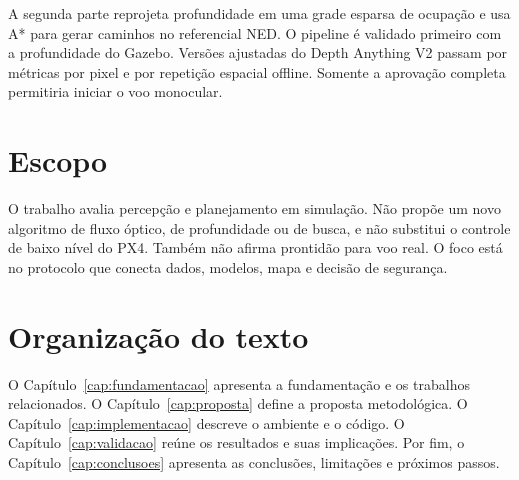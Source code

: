 A segunda parte reprojeta profundidade em uma grade esparsa de ocupação e usa A* para gerar caminhos no referencial NED. O pipeline é validado primeiro com a profundidade do Gazebo. Versões ajustadas do Depth Anything V2 passam por métricas por pixel e por repetição espacial offline. Somente a aprovação completa permitiria iniciar o voo monocular.

\section{Escopo}

O trabalho avalia percepção e planejamento em simulação. Não propõe um novo algoritmo de fluxo óptico, de profundidade ou de busca, e não substitui o controle de baixo nível do PX4. Também não afirma prontidão para voo real. O foco está no protocolo que conecta dados, modelos, mapa e decisão de segurança.

\section{Organização do texto}\label{Organizacao_do_texto}

O Capítulo~\ref{cap:fundamentacao} apresenta a fundamentação e os trabalhos relacionados. O Capítulo~\ref{cap:proposta} define a proposta metodológica. O Capítulo~\ref{cap:implementacao} descreve o ambiente e o código. O Capítulo~\ref{cap:validacao} reúne os resultados e suas implicações. Por fim, o Capítulo~\ref{cap:conclusoes} apresenta as conclusões, limitações e próximos passos.
